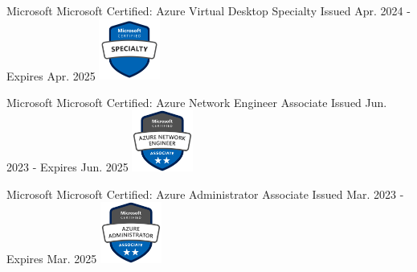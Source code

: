 \graphicspath{ {./images/} }




\begin{cventries}


\cventry
{Microsoft\vspace{2mm}} %
{Microsoft Certified: Azure Virtual Desktop Specialty} %
{} %
{Issued Apr. 2024 - Expires Apr. 2025} %
{ %
\includegraphics[height=2cm]{az-140}
}


\cventry
{Microsoft\vspace{2mm}} %
{Microsoft Certified: Azure Network Engineer Associate} %
{} %
{Issued Jun. 2023 - Expires Jun. 2025} %
{ %
\includegraphics[height=2cm]{az-700}
}


\cventry
{Microsoft\vspace{2mm}} %
{Microsoft Certified: Azure Administrator Associate} %
{} %
{Issued Mar. 2023 - Expires Mar. 2025} %
{ %
\includegraphics[height=2cm]{az-104}
}


\end{cventries}
